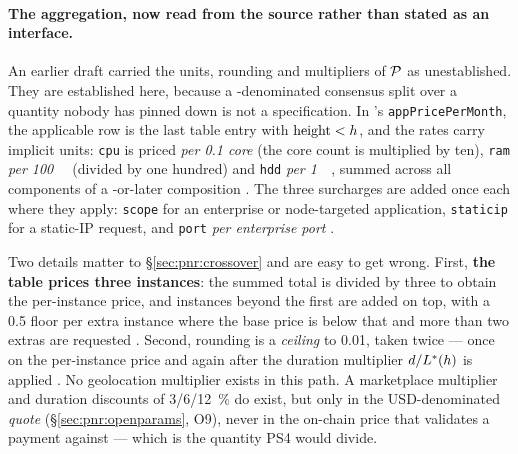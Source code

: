 \paragraph{The aggregation, now read from the source rather than stated as an interface.} An earlier
draft carried the units, rounding and multipliers of $\mathcal{P}$ as unestablished. They are established
here, because a \flux-denominated consensus split over a quantity nobody has pinned down is not a
specification. In \FluxOS's \texttt{app\allowbreak{}Price\allowbreak{}Per\allowbreak{}Month}, the
applicable row is the last table entry with $\text{height} < h$, and the rates carry implicit
units: \texttt{cpu} is priced \emph{per \num{0.1} core} (the core count is multiplied by ten),
\texttt{ram} \emph{per \SI{100}{\mega\byte}} (divided by one hundred) and \texttt{hdd} \emph{per
\SI{1}{\giga\byte}}, summed across all components of a -or-later composition \shipped
{}.
The three surcharges are added once each where they apply: \texttt{scope} for an enterprise or
node-targeted application, \texttt{staticip} for a static-IP request, and \texttt{port} \emph{per
enterprise port} \shipped
{}.

Two details matter to \S\ref{sec:pnr:crossover} and are easy to get wrong. First, \textbf{the table
prices three instances}: the summed total is divided by three to obtain the per-instance price, and
instances beyond the first are added on top, with a \num{0.5}\flux{} floor per extra instance where
the base price is below that and more than two extras are requested \shipped
{}.
Second, rounding is a \emph{ceiling} to \num{0.01}\flux{}, taken twice --- once on the per-instance
price and again after the duration multiplier $d/L^{\ast}(h)$ is applied \shipped
{}.
No geolocation multiplier exists in this path. A marketplace multiplier and duration discounts of
\num{3}/\num{6}/\SI{12}{\percent} do exist, but only in the USD-denominated \emph{quote}
(\S\ref{sec:pnr:openparams}, O9), never in the on-chain \flux{} price that \FluxOS{} validates a
payment against --- which is the quantity PS4 would divide. 

